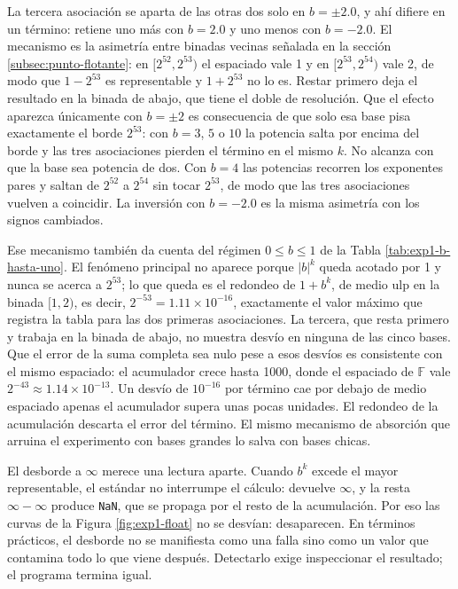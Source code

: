 La tercera asociación se aparta de las otras dos solo en $b = \pm 2.0$, y ahí difiere en un
término: retiene uno más con $b = 2.0$ y uno menos con $b = -2.0$. El mecanismo es la asimetría entre binadas vecinas señalada en la sección
\ref{subsec:punto-flotante}: en $[2^{52}, 2^{53})$ el espaciado vale 1 y en $[2^{53}, 2^{54})$ vale
2, de modo que $1 - 2^{53}$ es representable y $1 + 2^{53}$ no lo es. Restar primero deja el
resultado en la binada de abajo, que tiene el doble de resolución. Que el efecto aparezca
únicamente con $b = \pm 2$ es consecuencia de que solo esa base pisa exactamente el borde $2^{53}$:
con $b = 3$, $5$ o $10$ la potencia salta por encima del borde y las tres asociaciones pierden el
término en el mismo $k$. No alcanza con que la base sea potencia de dos. Con $b = 4$ las potencias
recorren los exponentes pares y saltan de $2^{52}$ a $2^{54}$ sin tocar $2^{53}$, de modo que las
tres asociaciones vuelven a coincidir. La inversión con $b = -2.0$ es la misma asimetría con los
signos cambiados.

Ese mecanismo también da cuenta del régimen $0 \le b \le 1$ de la Tabla
\ref{tab:exp1-b-hasta-uno}. El
fenómeno principal no aparece porque $|b|^{k}$ queda acotado por 1 y nunca se acerca a $2^{53}$; lo
que queda es el redondeo de $1 + b^{k}$, de medio ulp en la binada $[1, 2)$, es decir,
$2^{-53} = 1.11 \times 10^{-16}$, exactamente el valor máximo que registra la tabla para las dos
primeras asociaciones. La tercera, que resta primero y trabaja en la binada de abajo, no muestra
desvío en ninguna de las cinco bases. Que el error de la suma completa sea nulo pese a esos desvíos
es consistente con el mismo espaciado: el acumulador crece hasta 1000, donde el espaciado de
$\mathbb{F}$ vale $2^{-43} \approx 1.14 \times 10^{-13}$. Un desvío de $10^{-16}$ por término cae
por debajo de medio espaciado apenas el acumulador supera unas pocas unidades. El redondeo de la
acumulación descarta el error del término. El mismo mecanismo de absorción que arruina el
experimento con bases grandes lo salva con bases chicas.

El desborde a $\infty$ merece una lectura aparte. Cuando $b^{k}$ excede el mayor representable, el
estándar no interrumpe el cálculo: devuelve $\infty$, y la resta $\infty - \infty$ produce
\texttt{NaN}, que se propaga por el resto de la acumulación. Por eso las curvas de la Figura
\ref{fig:exp1-float} no se desvían: desaparecen. En términos prácticos, el desborde no se manifiesta
como una falla sino como un valor que contamina todo lo que viene después. Detectarlo exige
inspeccionar el resultado; el programa termina igual.

